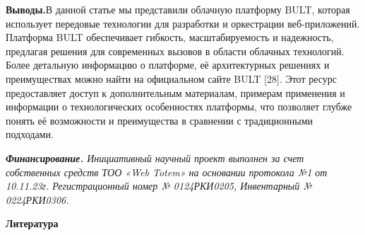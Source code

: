 \begin{multicols}{2}
{\bfseries Выводы.}В данной статье мы представили облачную платформу BULT,
которая использует передовые технологии для разработки и оркестрации
веб-приложений. Платформа BULT обеспечивает гибкость, масштабируемость и
надежность, предлагая решения для современных вызовов в области облачных
технологий. Более детальную информацию о платформе, её архитектурных
решениях и преимуществах можно найти на официальном сайте BULT {[}28{]}.
Этот ресурс предоставляет доступ к дополнительным материалам, примерам
применения и информации о технологических особенностях платформы, что
позволяет глубже понять её возможности и преимущества в сравнении с
традиционными подходами.

\emph{{\bfseries Финансирование.} Инициативный научный проект выполнен за
счет собственных средств ТОО «Web Totem» на основании протокола №1 от
10.11.23г. Регистрационный номер № 0124РКИ0205, Инвентарный №
0224РКИ0306.}
\end{multicols}

\begin{center}
{\bfseries Литература}
\end{center}

